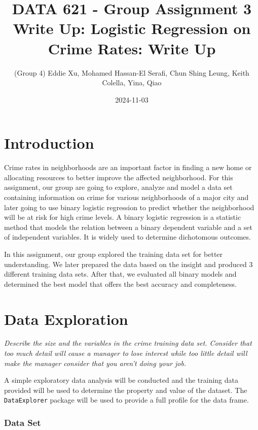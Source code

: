 \documentclass[
]{article}
\title{DATA 621 - Group Assignment 3 Write Up: Logistic Regression on
Crime Rates: Write Up}
\author{(Group 4) Eddie Xu, Mohamed Hassan-El Serafi, Chun Shing Leung,
Keith Colella, Yina, Qiao}
\date{2024-11-03}
\begin{document}
\maketitle

{
\setcounter{tocdepth}{3}
\tableofcontents
}
\section{Introduction}\label{introduction}

Crime rates in neighborhoods are an important factor in finding a new
home or allocating resources to better improve the affected
neighborhood. For this assignment, our group are going to explore,
analyze and model a data set containing information on crime for various
neighborhoods of a major city and later going to use binary logistic
regression to predict whether the neighborhood will be at risk for high
crime levels. A binary logistic regression is a statistic method that
models the relation between a binary dependent variable and a set of
independent variables. It is widely used to determine dichotomous
outcomes.

In this assignment, our group explored the training data set for better
understanding. We later prepared the data based on the insight and
produced 3 different training data sets. After that, we evaluated all
binary models and determined the best model that offers the best
accuracy and completeness.

\section{Data Exploration}\label{data-exploration}

\emph{Describe the size and the variables in the crime training data
set. Consider that too much detail will cause a manager to lose interest
while too little detail will make the manager consider that you aren't
doing your job.}

A simple exploratory data analysis will be conducted and the training
data provided will be used to determine the property and value of the
dataset. The \texttt{DataExplorer} package will be used to provide a
full profile for the data frame.

\subsubsection{Data Set}\label{data-set}
\end{document}
